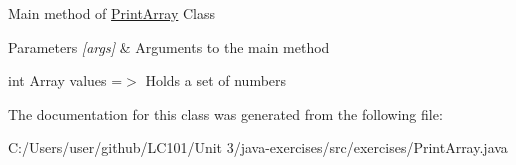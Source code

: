 Main method of \mbox{\hyperlink{classexercises_1_1_print_array}{Print\+Array}} Class 
\begin{DoxyParams}{Parameters}
{\em \mbox{[}args\mbox{]}} & Arguments to the main method \\
\hline
\end{DoxyParams}
int Array values =$>$ Holds a set of numbers 

The documentation for this class was generated from the following file\+:\begin{DoxyCompactItemize}
\item 
C\+:/\+Users/user/github/\+L\+C101/\+Unit 3/java-\/exercises/src/exercises/Print\+Array.\+java\end{DoxyCompactItemize}
